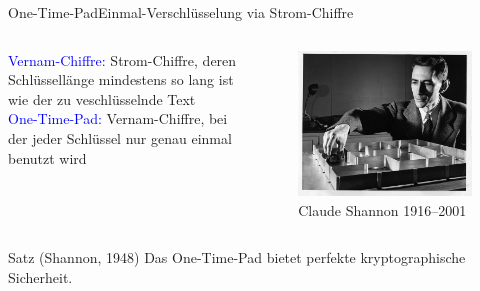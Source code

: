 \documentclass{beamer}
\newcommand{\tb}[1]{{\textcolor{blue}{#1}}}
\theoremstyle{plain}
\begin{document}
 \begin{frame}{One-Time-Pad}{Einmal-Verschlüsselung via Strom-Chiffre}
  \begin{columns}
   \begin{column}{0.6\textwidth}
    \tb{Vernam-Chiffre:} Strom-Chiffre, deren Schlüssellänge mindestens so lang ist wie der zu veschlüsselnde Text \\
    \tb{One-Time-Pad:} Vernam-Chiffre, bei der jeder Schlüssel nur genau einmal benutzt wird
   \end{column}
   \pause
   \begin{column}{0.3\textwidth}
    \begin{center}
    \begin{figure}
     \includegraphics[height=0.3\textheight]{shannon}
     \caption{Claude Shannon 1916--2001}
     \end{figure}
    \end{center}
   \end{column}
  \end{columns}
  
  \begin{exampleblock}{Satz (Shannon, 1948)}
   Das One-Time-Pad bietet perfekte kryptographische Sicherheit.
  \end{exampleblock}
 \end{frame}
\end{document}
